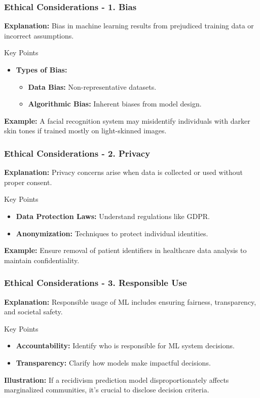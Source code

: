 \documentclass[aspectratio=169]{beamer}
\begin{document}
\begin{frame}[fragile]
    \frametitle{Ethical Considerations - 1. Bias}
    \textbf{Explanation:} Bias in machine learning results from prejudiced training data or incorrect assumptions.

    \begin{block}{Key Points}
        \begin{itemize}
            \item \textbf{Types of Bias:}
                \begin{itemize}
                    \item \textbf{Data Bias:} Non-representative datasets.
                    \item \textbf{Algorithmic Bias:} Inherent biases from model design.
                \end{itemize}
        \end{itemize}
    \end{block}

    \textbf{Example:} A facial recognition system may misidentify individuals with darker skin tones if trained mostly on light-skinned images.
\end{frame}

\begin{frame}[fragile]
    \frametitle{Ethical Considerations - 2. Privacy}
    \textbf{Explanation:} Privacy concerns arise when data is collected or used without proper consent.

    \begin{block}{Key Points}
        \begin{itemize}
            \item \textbf{Data Protection Laws:} Understand regulations like GDPR.
            \item \textbf{Anonymization:} Techniques to protect individual identities.
        \end{itemize}
    \end{block}

    \textbf{Example:} Ensure removal of patient identifiers in healthcare data analysis to maintain confidentiality.
\end{frame}

\begin{frame}[fragile]
    \frametitle{Ethical Considerations - 3. Responsible Use}
    \textbf{Explanation:} Responsible usage of ML includes ensuring fairness, transparency, and societal safety.

    \begin{block}{Key Points}
        \begin{itemize}
            \item \textbf{Accountability:} Identify who is responsible for ML system decisions.
            \item \textbf{Transparency:} Clarify how models make impactful decisions.
        \end{itemize}
    \end{block}

    \textbf{Illustration:} If a recidivism prediction model disproportionately affects marginalized communities, it’s crucial to disclose decision criteria.
\end{frame}
\end{document}

